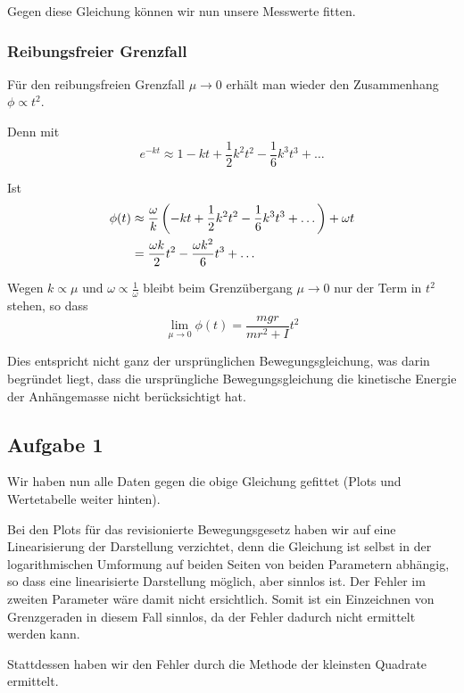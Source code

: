 \documentclass[a4paper,german,12pt,smallheadings]{scrartcl}
\begin{document}
Gegen diese Gleichung können wir nun unsere Messwerte fitten.

\subsubsection{Reibungsfreier Grenzfall}
Für den reibungsfreien Grenzfall $\mu \to
0$ erhält man wieder den Zusammenhang $\phi \propto t^2$.

Denn mit
\begin{equation}
  e^{-kt} \approx 1 - kt + \frac{1}{2} k^2 t^2 - \frac{1}{6} k^3t^3 + \dots
\end{equation}

Ist
\begin{align}
  \phi(t) &\approx \frac{\omega}{k}\del{-kt + \frac{1}{2}k^2t^2 - \frac{1}{6} k^3t^3 + \dots} + \omega t\\
          &= \frac{\omega k}{2} t^2 -  \frac{\omega k^2}{6} t^3 + \dots
\end{align}

Wegen $k \propto \mu$ und $\omega \propto \frac{1}{\omega}$ bleibt beim Grenzübergang $\mu \to 0$ nur der Term in $t^2$ stehen, so dass
\begin{equation}
  \lim_{\mu \to 0} \phi(t) = \frac{mgr}{mr^2 +I} t^2
\end{equation}

Dies entspricht nicht ganz der ursprünglichen Bewegungsgleichung, was darin
begründet liegt, dass die ursprüngliche Bewegungsgleichung die kinetische
Energie der Anhängemasse nicht berücksichtigt hat.

\subsection{Aufgabe 1}
Wir haben nun alle Daten gegen die obige Gleichung gefittet (Plots und
Wertetabelle weiter hinten).

Bei den Plots für das revisionierte Bewegungsgesetz haben wir auf eine
Linearisierung der Darstellung verzichtet, denn die Gleichung ist selbst in der
logarithmischen Umformung auf beiden Seiten von beiden Parametern abhängig, so
dass eine linearisierte Darstellung möglich, aber sinnlos ist. Der Fehler im
zweiten Parameter wäre damit nicht ersichtlich. Somit ist ein Einzeichnen von
Grenzgeraden in diesem Fall sinnlos, da der Fehler dadurch nicht ermittelt
werden kann.

Stattdessen haben wir den Fehler durch die Methode der kleinsten Quadrate
ermittelt.
\end{document}
